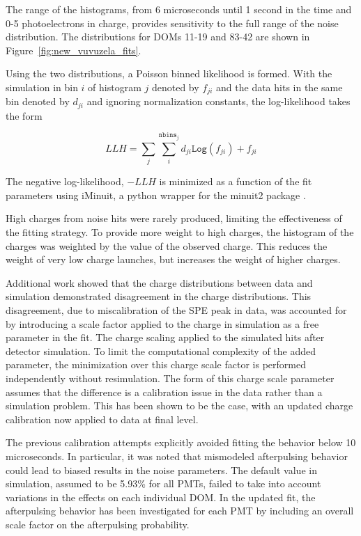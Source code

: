 The range of the histograms, from 6 microseconds until 1 second in the time and 0-5 photoelectrons in charge, provides sensitivity to the full range of the noise distribution.
The distributions for DOMs 11-19 and 83-42 are shown in Figure~\ref{fig:new_vuvuzela_fits}.

Using the two distributions, a Poisson binned likelihood is formed.
With the simulation in bin $i$ of histogram $j$ denoted by $f_{ji}$ and the data hits in the same bin denoted by $d_{ji}$ and ignoring normalization constants, the log-likelihood takes the form

\begin{equation}
	LLH = \sum_j \sum_i^{\mathtt{nbins}_j} d_{ji} \mathtt{Log}(f_{ji}) + f_{ji}
\end{equation}

The negative log-likelihood, $-LLH$ is minimized as a function of the fit parameters using iMinuit, a python wrapper for the minuit2 package \cite{iminuit-code, iminuit-paper}.

High charges from noise hits were rarely produced, limiting the effectiveness of the fitting strategy.
To provide more weight to high charges, the histogram of the charges was weighted by the value of the observed charge.
This reduces the weight of very low charge launches, but increases the weight of higher charges.

Additional work showed that the charge distributions between data and simulation demonstrated disagreement in the charge distributions. 
This disagreement, due to miscalibration of the SPE peak in data, was accounted for by introducing a scale factor applied to the charge in simulation as a free parameter in the fit.
The charge scaling applied to the simulated hits after detector simulation.
To limit the computational complexity of the added parameter, the minimization over this charge scale factor is performed independently without resimulation.
The form of this charge scale parameter assumes that the difference is a calibration issue in the data rather than a simulation problem.
This has been shown to be the case, with an updated charge calibration now applied to data at final level.

The previous calibration attempts explicitly avoided fitting the behavior below 10 microseconds.
In particular, it was noted that mismodeled afterpulsing behavior could lead to biased results in the noise parameters.
The default value in simulation, assumed to be 5.93\% for all PMTs, failed to take into account variations in the effects on each individual DOM.
In the updated fit, the afterpulsing behavior has been investigated for each PMT by including an overall scale factor on the afterpulsing probability.

